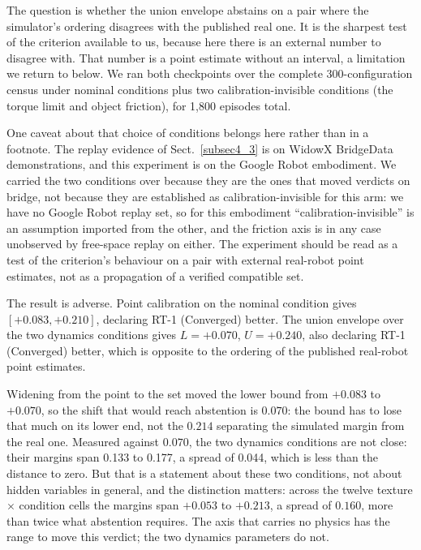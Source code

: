 \documentclass[pdflatex,iicol,sn-apa]{sn-jnl}
\theoremstyle{remark}
\begin{document}
The question is whether the union envelope abstains on a pair where the simulator's ordering
disagrees with the published real one. It is the sharpest test of the criterion available to us,
because here there is an external number to disagree with. That number is a point estimate
without an interval, a limitation we return to below. We ran both checkpoints over the complete
300-configuration census under nominal conditions plus two calibration-invisible conditions (the
torque limit and object friction), for 1{,}800 episodes total.

One caveat about that choice of conditions belongs here rather than in a footnote. The replay
evidence of Sect.~\ref{subsec4_3} is on WidowX BridgeData demonstrations, and this experiment
is on the Google Robot embodiment. We carried the two conditions over because they are the ones that
moved verdicts on bridge, not because they are established as calibration-invisible for this arm: we
have no Google Robot replay set, so for this embodiment ``calibration-invisible'' is an assumption
imported from the other, and the friction axis is in any case unobserved by free-space replay on
either. The experiment should be read as a test of the criterion's behaviour on a pair with external
real-robot point estimates, not as a propagation of a verified compatible set.

The result is adverse. Point calibration on the nominal condition gives $[+0.083, +0.210]$, declaring
RT-1 (Converged) better. The union envelope over the two dynamics conditions gives
$L = +0.070$, $U = +0.240$, also declaring RT-1 (Converged) better, which is opposite to the
ordering of the published real-robot point estimates.

Widening from the point to the set moved the lower bound from $+0.083$ to $+0.070$, so the shift
that would reach abstention is $0.070$: the bound has to lose that much on its lower end, not the
$0.214$ separating the simulated margin from the real one. Measured against $0.070$, the two dynamics
conditions are not close: their margins span 0.133 to 0.177, a spread of 0.044, which is less than
the distance to zero. But that is a statement about these two conditions, not about hidden
variables in general, and the distinction matters: across the twelve texture $\times$ condition cells
the margins span $+0.053$ to $+0.213$, a spread of $0.160$, more than twice what abstention requires.
The axis that carries no physics has the range to move this verdict; the two dynamics parameters do
not.
\end{document}
